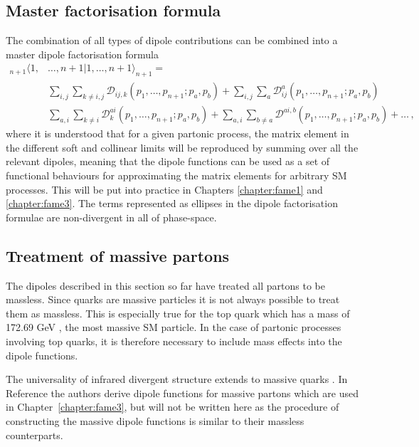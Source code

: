 \documentclass[main.tex]{subfiles}
\begin{document}
    \subsection{Master factorisation formula}
        The combination of all types of dipole contributions
        can be combined into a master dipole factorisation formula
        \begin{equation}\label{eqn:dipole_factorisation_master}
            \begin{split}
            {}_{n+1} \langle 1, &\ldots, n+1 | 1, \ldots, n+1 \rangle_{n+1} = \\
            &\sum_{i,j}\sum_{k \neq i, j} \mathcal{D}_{ij,k}(p_{1},\ldots,p_{n+1};p_{a},p_{b}) + \sum_{i,j}\sum_{a} \mathcal{D}_{ij}^{a}(p_{1},\ldots,p_{n+1};p_{a},p_{b}) \\
            &\sum_{a,i}\sum_{k \neq i} \mathcal{D}_{k}^{ai}(p_{1},\ldots,p_{n+1};p_{a},p_{b}) + \sum_{a,i}\sum_{b \neq a} \mathcal{D}^{ai,b}(p_{1},\ldots,p_{n+1};p_{a},p_{b}) + \ldots \, ,
            \end{split}
        \end{equation}
        where it is understood that for a given partonic process,
        the matrix element in the different soft and collinear limits will be
        reproduced by summing over all the relevant dipoles, meaning that
        the dipole functions can be used as a set of functional behaviours for
        approximating the matrix elements for arbitrary SM processes.
        This will be put into practice in Chapters \ref{chapter:fame1}
        and \ref{chapter:fame3}. The terms represented as ellipses in
        the dipole factorisation formulae are non-divergent
        in all of phase-space.

    \subsection{Treatment of massive partons}
        The dipoles described in this section so far have
        treated all partons to be massless. Since quarks are massive
        particles it is not always possible to treat them
        as massless. This is especially true for the top
        quark which has a mass of 172.69 GeV \cite{Workman:2022ynf}, the
        most massive SM particle. In the case of partonic
        processes involving top quarks, it is therefore
        necessary to include mass effects into the dipole
        functions.

        The universality of infrared divergent structure
        extends to massive quarks \cite{Catani:2000ef}.
        In Reference \cite{Catani:2002hc} the authors derive dipole
        functions for massive partons which
        are used in Chapter~\ref{chapter:fame3}, but will
        not be written here as the procedure of constructing
        the massive dipole functions is similar to their massless counterparts.
\end{document}

